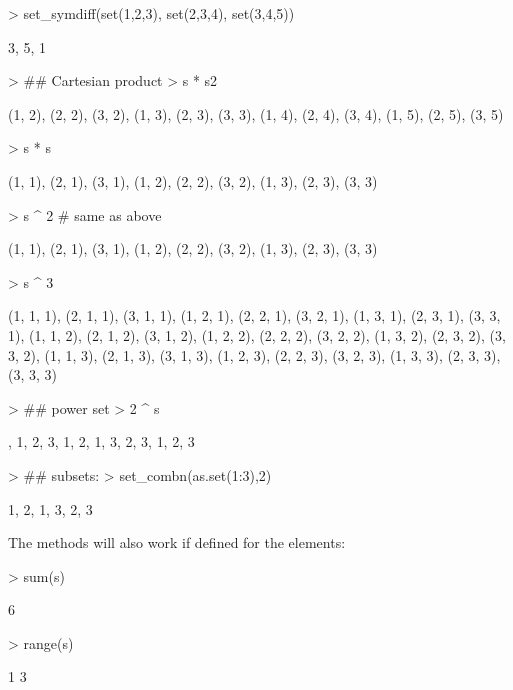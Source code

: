\documentclass[fleqn]{article}
\newcommand{\codefun}[1]{\code{#1()}}
\begin{document}
\begin{Schunk}
\begin{Sinput}
> set_symdiff(set(1,2,3), set(2,3,4), set(3,4,5))
\end{Sinput}
\begin{Soutput}
{3, 5, 1}
\end{Soutput}
\begin{Sinput}
> ## Cartesian product
> s * s2
\end{Sinput}
\begin{Soutput}
{(1, 2), (2, 2), (3, 2), (1, 3), (2, 3), (3, 3), (1, 4), (2, 4), (3,
 4), (1, 5), (2, 5), (3, 5)}
\end{Soutput}
\begin{Sinput}
> s * s
\end{Sinput}
\begin{Soutput}
{(1, 1), (2, 1), (3, 1), (1, 2), (2, 2), (3, 2), (1, 3), (2, 3), (3,
 3)}
\end{Soutput}
\begin{Sinput}
> s ^ 2 # same as above
\end{Sinput}
\begin{Soutput}
{(1, 1), (2, 1), (3, 1), (1, 2), (2, 2), (3, 2), (1, 3), (2, 3), (3,
 3)}
\end{Soutput}
\begin{Sinput}
> s ^ 3
\end{Sinput}
\begin{Soutput}
{(1, 1, 1), (2, 1, 1), (3, 1, 1), (1, 2, 1), (2, 2, 1), (3, 2, 1), (1,
 3, 1), (2, 3, 1), (3, 3, 1), (1, 1, 2), (2, 1, 2), (3, 1, 2), (1, 2,
 2), (2, 2, 2), (3, 2, 2), (1, 3, 2), (2, 3, 2), (3, 3, 2), (1, 1, 3),
 (2, 1, 3), (3, 1, 3), (1, 2, 3), (2, 2, 3), (3, 2, 3), (1, 3, 3), (2,
 3, 3), (3, 3, 3)}
\end{Soutput}
\begin{Sinput}
> ## power set
> 2 ^ s
\end{Sinput}
\begin{Soutput}
{{}, {1}, {2}, {3}, {1, 2}, {1, 3}, {2, 3}, {1, 2, 3}}
\end{Soutput}
\begin{Sinput}
> ## subsets:
> set_combn(as.set(1:3),2)
\end{Sinput}
\begin{Soutput}
{{1, 2}, {1, 3}, {2, 3}}
\end{Soutput}
\end{Schunk}
The \codefun{Summary} methods will also work if defined for the
elements:
\begin{Schunk}
\begin{Sinput}
> sum(s)
\end{Sinput}
\begin{Soutput}
[1] 6
\end{Soutput}
\begin{Sinput}
> range(s)
\end{Sinput}
\begin{Soutput}
[1] 1 3
\end{Soutput}
\end{Schunk}
\end{document}
